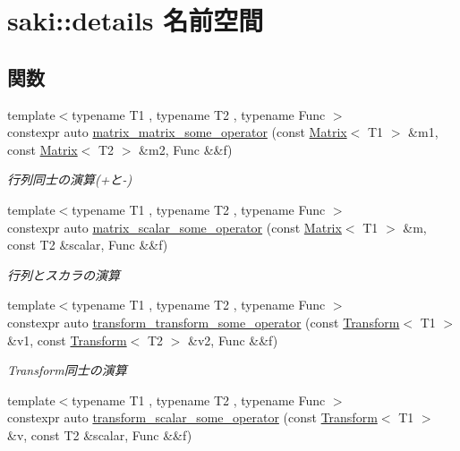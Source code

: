 \hypertarget{namespacesaki_1_1details}{}\section{saki\+:\+:details 名前空間}
\label{namespacesaki_1_1details}
\subsection*{関数}
\begin{DoxyCompactItemize}
\item 
{\footnotesize template$<$typename T1 , typename T2 , typename Func $>$ }\\constexpr auto \mbox{\hyperlink{namespacesaki_1_1details_ab331ad2e5330aa422492d228d522aeea}{matrix\+\_\+matrix\+\_\+some\+\_\+operator}} (const \mbox{\hyperlink{classsaki_1_1_matrix}{Matrix}}$<$ T1 $>$ \&m1, const \mbox{\hyperlink{classsaki_1_1_matrix}{Matrix}}$<$ T2 $>$ \&m2, Func \&\&f)
\begin{DoxyCompactList}\small\item\em 行列同士の演算(+と-\/) \end{DoxyCompactList}\item 
{\footnotesize template$<$typename T1 , typename T2 , typename Func $>$ }\\constexpr auto \mbox{\hyperlink{namespacesaki_1_1details_a3b467138701d036240cfbf728d3a7a2d}{matrix\+\_\+scalar\+\_\+some\+\_\+operator}} (const \mbox{\hyperlink{classsaki_1_1_matrix}{Matrix}}$<$ T1 $>$ \&m, const T2 \&scalar, Func \&\&f)
\begin{DoxyCompactList}\small\item\em 行列とスカラの演算 \end{DoxyCompactList}\item 
{\footnotesize template$<$typename T1 , typename T2 , typename Func $>$ }\\constexpr auto \mbox{\hyperlink{namespacesaki_1_1details_a7f4dc51673838db3e3827296124c1fe9}{transform\+\_\+transform\+\_\+some\+\_\+operator}} (const \mbox{\hyperlink{classsaki_1_1_transform}{Transform}}$<$ T1 $>$ \&v1, const \mbox{\hyperlink{classsaki_1_1_transform}{Transform}}$<$ T2 $>$ \&v2, Func \&\&f)
\begin{DoxyCompactList}\small\item\em Transform同士の演算 \end{DoxyCompactList}\item 
{\footnotesize template$<$typename T1 , typename T2 , typename Func $>$ }\\constexpr auto \mbox{\hyperlink{namespacesaki_1_1details_a438d746d0acdacae59451776394228ee}{transform\+\_\+scalar\+\_\+some\+\_\+operator}} (const \mbox{\hyperlink{classsaki_1_1_transform}{Transform}}$<$ T1 $>$ \&v, const T2 \&scalar, Func \&\&f)

\end{DoxyCompactItemize}

